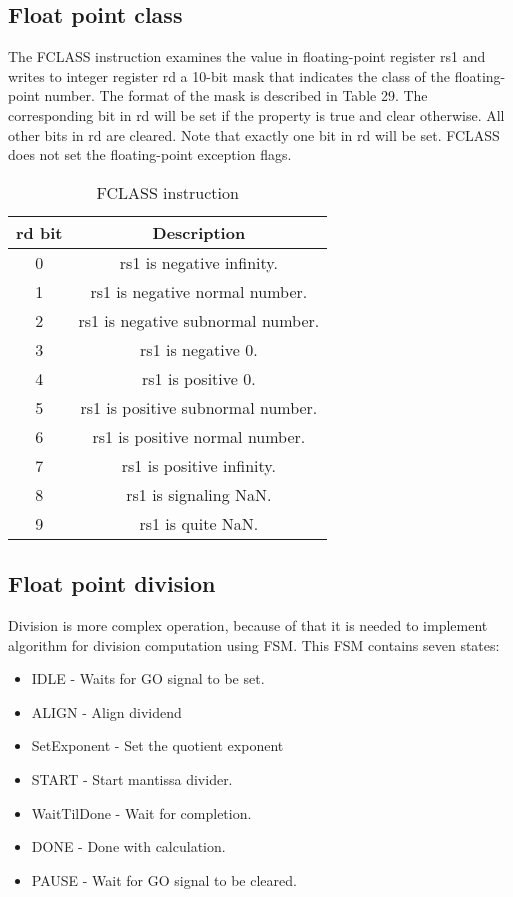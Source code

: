 \documentclass{scrreprt}
\begin{document}
\subsection*{Float point class}
The FCLASS instruction examines the value in floating-point register rs1 and writes to integer register rd a 10-bit mask that indicates the class of the floating-point number. The format of the mask is described in Table 29. The corresponding bit in rd will be set if the property is true and clear otherwise. All other bits in rd are cleared. Note that exactly one bit in rd will be set. FCLASS does not set the floating-point exception flags.
\begin{table}[htb!]
            \centering
            \begin{tabular}{|c|c|} \hline 
             rd bit & Description \\ \hline  
             0 & rs1 is negative infinity.  \\ \hline
             1 & rs1 is negative normal number.  \\ \hline
             2 & rs1 is negative subnormal number.  \\ \hline
             3 & rs1 is negative 0.  \\ \hline
             4 & rs1 is positive 0.  \\ \hline
             5 & rs1 is positive subnormal number.  \\ \hline
             6 & rs1 is positive normal number.  \\ \hline
             7 & rs1 is positive infinity.  \\ \hline
             8 & rs1 is signaling NaN.  \\ \hline
             9 & rs1 is quite NaN.  \\ \hline
        \end{tabular}
        \caption{FCLASS instruction}
\end{table}
\newline
\newline
\newline
{} 
\subsection*{Float point division}
Division is more complex operation, because of that it is needed to implement algorithm for division computation using FSM. This FSM contains seven states: 
\begin{itemize}
    \item  IDLE - Waits for GO signal to be set.
    \item  ALIGN - Align dividend 
    \item  SetExponent - Set the quotient exponent
    \item  START - Start mantissa divider.
    \item  WaitTilDone - Wait for completion.
    \item  DONE - Done with calculation.
    \item  PAUSE - Wait for GO signal to be cleared.
\end{itemize}
\end{document}
